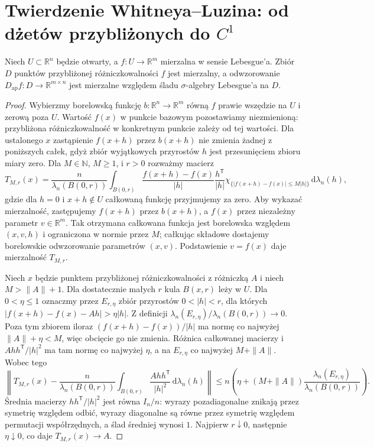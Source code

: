 \section{Twierdzenie Whitneya--Luzina: od dżetów przybliżonych do \texorpdfstring{$C^1$}{C\string^1}}
\begin{lemat}
\label{lem:dzety-ap-meas}
Niech $U\subset\mathbb R^n$ będzie otwarty,
a $f:U\to\mathbb R^m$ mierzalna w sensie Lebesgue'a.
Zbiór $D$ punktów przybliżonej różniczkowalności
$f$ jest mierzalny, a odwzorowanie
$D_{\mathrm{ap}}f:D\to\mathbb R^{m\times n}$
jest mierzalne względem śladu $\sigma$-algebry Lebesgue'a
na $D$.
\end{lemat}
\begin{proof}
Wybierzmy borelowską funkcję $b:\mathbb R^n\to\mathbb R^m$
równą $f$ prawie wszędzie na $U$ i zerową poza $U$.
Wartość $f(x)$ w punkcie bazowym pozostawiamy
niezmienioną: przybliżona różniczkowalność
w konkretnym punkcie zależy od tej wartości.
Dla ustalonego $x$ zastąpienie $f(x+h)$ przez $b(x+h)$
nie zmienia żadnej z poniższych całek, gdyż zbiór
wyjątkowych przyrostów $h$ jest przesunięciem
zbioru miary zero. Dla $M\in\mathbb N$, $M\ge1$,
i $r>0$ rozważmy macierz
\[
 T_{M,r}(x)=\frac{n}{\lambda_n(B(0,r))}
 \int_{B(0,r)}\frac{f(x+h)-f(x)}{|h|}
 \frac{h^{\mathsf T}}{|h|}
 \chi_{\{|f(x+h)-f(x)|\le M|h|\}}
 \,\mathrm d\lambda_n(h),
\]
gdzie dla $h=0$ i $x+h\notin U$ całkowaną funkcję
przyjmujemy za zero. Aby wykazać mierzalność,
zastępujemy $f(x+h)$ przez $b(x+h)$, a $f(x)$ przez
niezależny parametr $v\in\mathbb R^m$. Tak otrzymana
całkowana funkcja jest borelowska względem $(x,v,h)$
i ograniczona w normie przez $M$; całkując składowe
dostajemy borelowskie odwzorowanie parametrów $(x,v)$.
Podstawienie $v=f(x)$ daje mierzalność $T_{M,r}$.

Niech $x$ będzie punktem przybliżonej różniczkowalności
z różniczką $A$ i niech $M>\|A\|+1$.
Dla dostatecznie małych $r$ kula $B(x,r)$ leży w $U$.
Dla $0<\eta\le1$ oznaczmy przez $E_{r,\eta}$
zbiór przyrostów $0<|h|<r$, dla których
$|f(x+h)-f(x)-Ah|>\eta|h|$.
Z definicji $\lambda_n(E_{r,\eta})/\lambda_n(B(0,r))\to0$.
Poza tym zbiorem iloraz $(f(x+h)-f(x))/|h|$
ma normę co najwyżej $\|A\|+\eta<M$,
więc obcięcie go nie zmienia. Różnica całkowanej
macierzy i $Ahh^{\mathsf T}/|h|^2$ ma tam normę
co najwyżej $\eta$, a na $E_{r,\eta}$ co najwyżej
$M+\|A\|$. Wobec tego
\[
 \left\|T_{M,r}(x)-
 \frac{n}{\lambda_n(B(0,r))}
 \int_{B(0,r)}\frac{Ahh^{\mathsf T}}{|h|^2}
 \,\mathrm d\lambda_n(h)\right\|
 \le n\left(\eta+(M+\|A\|)
 \frac{\lambda_n(E_{r,\eta})}{\lambda_n(B(0,r))}\right).
\]
Średnia macierzy $hh^{\mathsf T}/|h|^2$ jest równa
$I_n/n$: wyrazy pozadiagonalne znikają przez symetrię
względem odbić, wyrazy diagonalne są równe przez
symetrię względem permutacji współrzędnych,
a ślad średniej wynosi $1$. Najpierw $r\downarrow0$,
następnie $\eta\downarrow0$, co daje $T_{M,r}(x)\to A$.


\end{proof}
